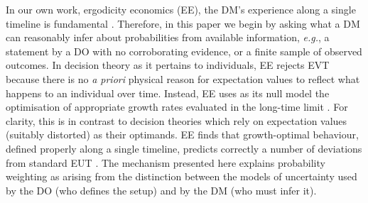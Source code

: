 \documentclass[12pt,letter,timesnewroman]{article}
\newcommand{\eg}{\textit{e.g.}}
\begin{document}

In our own work, ergodicity economics (EE), the DM's experience along a single timeline is fundamental \parencite{Peters2019b}. Therefore, in this paper we begin by asking what a DM can reasonably infer about probabilities from available information, \eg, a statement by a DO with no corroborating evidence, or a finite sample of observed outcomes. In decision theory as it pertains to individuals, EE rejects EVT because there is no {\it a priori} physical reason for expectation values to reflect what happens to an individual over time. Instead, EE uses as its null model the optimisation of appropriate growth rates evaluated in the long-time limit \parencite{Peters2011a,Peters2011b,Peters2019b}. For clarity, this is in contrast to decision theories which rely on expectation values (suitably distorted) as their optimands. EE finds that growth-optimal behaviour, defined properly along a single timeline, predicts correctly a number of deviations from standard EUT \parencite{MederETAL2019,AdamouETAL2019,BermanKirstein2020}. The mechanism presented here explains probability weighting as arising from the distinction between the models of uncertainty used by the DO (who defines the setup) and by the DM (who must infer it).
\end{document}
